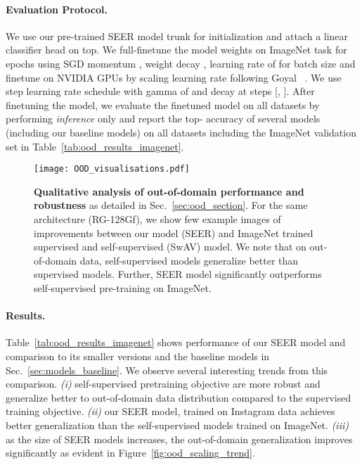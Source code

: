 \documentclass[10pt,twocolumn,letterpaper]{article}
\begin{document}
\paragraph{Evaluation Protocol.} We use our pre-trained SEER model trunk for initialization and attach a linear classifier head on top. We full-finetune the model weights on ImageNet task for  epochs using SGD momentum , weight decay , learning rate of  for batch size  and finetune on  NVIDIA GPUs by scaling learning rate following Goyal \etal~\cite{goyal2017accurate}. We use step learning rate schedule with gamma of  and decay at steps [, ]. After finetuning the model, we evaluate the finetuned model on all  datasets by performing \textit{inference} only and report the top- accuracy of several models (including our baseline models) on all datasets including the ImageNet validation set in Table~\ref{tab:ood_results_imagenet}.


\begin{figure*}[t]
  \centering
  \texttt{[image: OOD\_visualisations.pdf]}
  \caption{
    \textbf{Qualitative analysis of out-of-domain performance and robustness} as detailed in Sec.~\ref{sec:ood_section}. For the same architecture (RG-128Gf), we show few example images of improvements between our model (SEER) and ImageNet trained supervised and self-supervised (SwAV) model. We note that on out-of-domain data, self-supervised models generalize better than supervised models. Further, SEER model significantly outperforms self-supervised pre-training on ImageNet.
  }
  \label{fig:ood_visualisation}
\end{figure*}

\paragraph{Results.}
Table~\ref{tab:ood_results_imagenet} shows performance of our SEER model and comparison to its smaller versions and the baseline models in Sec.~\ref{sec:models_baseline}. We observe several interesting trends from this comparison. 
\textit{(i)} self-supervised pretraining objective are more robust and generalize better to out-of-domain data distribution compared to the supervised training objective.
\textit{(ii)} our SEER model, trained on Instagram data achieves better generalization than the self-supervised models trained on ImageNet.
\textit{(iii)} as the size of SEER models increases, the out-of-domain generalization improves significantly as evident in Figure~\ref{fig:ood_scaling_trend}. 
\end{document}
